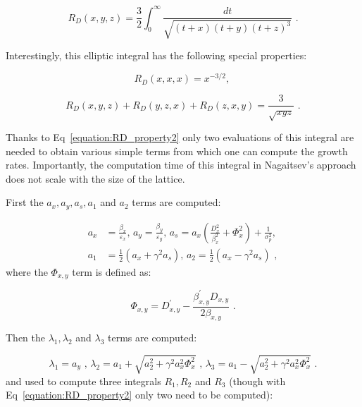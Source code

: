 \begin{equation}
    R_D(x, y, z) = \frac{3}{2} \int_{0}^{\infty} \frac{dt}{\sqrt{(t + x)(t + y)(t + z)^3}} \text{ .}
    \label{equation:elliptic_integrals}
\end{equation}
\newline

Interestingly, this elliptic integral has the following special properties:

\begin{equation}
    R_D(x, x, x) = x^{-3/2} \text{,  }
    \label{equation:RD_property1}
\end{equation}

\begin{equation}
    R_D(x, y, z) + R_D(y, z, x) + R_D(z, x, y) = \frac{3}{\sqrt{xyz}} \text{ .}
    \label{equation:RD_property2}
\end{equation}

Thanks to Eq~\eqref{equation:RD_property2} only two evaluations of this integral are needed to obtain various simple terms from which one can compute the growth rates.
Importantly, the computation time of this integral in Nagaitsev's approach does not scale with the size of the lattice.
\newline

First the \(a_x, a_y, a_s, a_1\) and \(a_2\) terms are computed:

\begin{equation}
    \begin{aligned}
        a_x &= \frac{\beta_x}{\varepsilon_x} \text{,  }
        a_y = \frac{\beta_y}{\varepsilon_y} \text{,  }
        a_s = a_x \left( \frac{D_x^{2}}{\beta_x^{2}} + \Phi_x^2 \right) + \frac{1}{\sigma_p^{2}} \text{,  } \\
        a_1 &= \frac{1}{2} (a_x + \gamma^2 a_s) \text{,  }
        a_2 = \frac{1}{2} (a_x - \gamma^2 a_s) \text{ ,}
    \end{aligned}
    \label{equation:nagaitsev_step1}
\end{equation}
where the \(\Phi_{x,y}\) term is defined as:

\begin{equation}
    \Phi_{x,y} = D_{x,y}^{\prime} - \frac{\beta_{x,y}^{\prime} D_{x,y}}{2 \beta_{x,y}} \text{ .}
\end{equation}

Then the \(\lambda_1, \lambda_2\) and \(\lambda_3\) terms are computed:

\begin{equation}
    \lambda_1 = a_y \text{ , }
    \lambda_2 = a_1 + \sqrt{a_2^{2} + \gamma^2 a_x^{2} \Phi_x^2} \text{ , }
    \lambda_3 = a_1 - \sqrt{a_2^{2} + \gamma^2 a_x^{2} \Phi_x^2} \text{ .}
    \label{equation:nagaitsev_lambdas}
\end{equation}
and used to compute three integrals \(R_1, R_2\) and \(R_3\) (though with Eq~\eqref{equation:RD_property2} only two need to be computed):

